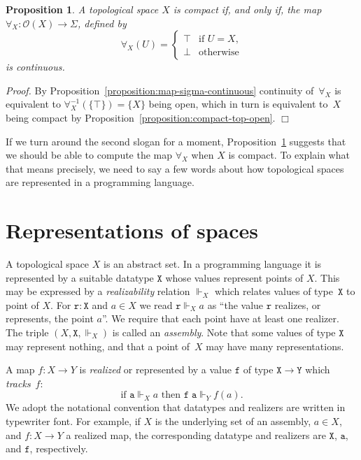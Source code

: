 \documentclass[a4paper,10pt]{article}
\newtheorem{proposition}[theorem]{Proposition}
\newenvironment{proof}{\par\noindent\textit{Proof.}}{\hfill$\Box$\par\medskip}
\newcommand{\set}[1]{\{#1\}}
\newcommand{\tpl}[1]{\mathcal{O}(#1)}
\newcommand{\R}[1]{\mathtt{#1}}
\newcommand{\rz}{\Vdash}
\begin{document}
\begin{proposition}
  \label{proposition:compact-iff-forall-continuous}
  A topological space $X$ is compact if, and only if, the map $\forall_X :
  \tpl{X} \to \Sigma$, defined by
  \begin{equation*} \forall_X(U) =
    \begin{cases} \top & \text{if $U = X$,}\\ \bot & \text{otherwise}
    \end{cases}
  \end{equation*}
  is continuous.
\end{proposition}

\begin{proof} By Proposition~\ref{proposition:map-sigma-continuous} continuity
of~$\forall_X$ is equivalent to $\forall_X^{-1}(\set{\top}) = \set{X}$ being
open, which in turn is equivalent to~$X$ being compact by
Proposition~\ref{proposition:compact-top-open}.
\end{proof}

If we turn around the second slogan for a moment,
Proposition~\ref{proposition:compact-iff-forall-continuous} suggests that we
should be able to compute the map $\forall_X$ when $X$ is compact. To explain
what that means precisely, we need to say a few words about how topological
spaces are represented in a programming language.

\section{Representations of spaces}
\label{sec:representations}

A topological space $X$ is an abstract set. In a programming language it is
represented by a suitable datatype $\mathtt{X}$ whose values represent points
of $X$. This may be expressed by a \emph{realizability} relation $\rz_X$ which
relates values of type~$\mathtt{X}$ to point of $X$. For $\R{r} : \mathtt{X}$
and $a \in X$ we read $\R{r} \rz_X a$ as ``the value $\R{r}$ realizes, or
represents, the point $a$''. We require that each point have at least one
realizer. The triple $(X, \mathtt{X}, {\rz_X})$ is called an \emph{assembly}.
Note that some values of type $\mathtt{X}$ may represent nothing, and that a
point of~$X$ may have many representations.

A map $f : X \to Y$ is \emph{realized} or represented by a value $\R{f}$ of
type $\mathtt{X} \to \mathtt{Y}$ which \emph{tracks}~$f$:
% 
\begin{equation*} \text{if $\R{a} \rz_X a$ then $\R{f}\;\R{a} \rz_Y f(a)$.}
\end{equation*}
% 
We adopt the notational convention that datatypes and realizers are written in
typewriter font. For example, if $X$ is the underlying set of an assembly, $a
\in X$, and $f : X \to Y$ a realized map, the corresponding datatype and
realizers are $\mathtt{X}$, $\R{a}$, and $\R{f}$, respectively.
\end{document}
